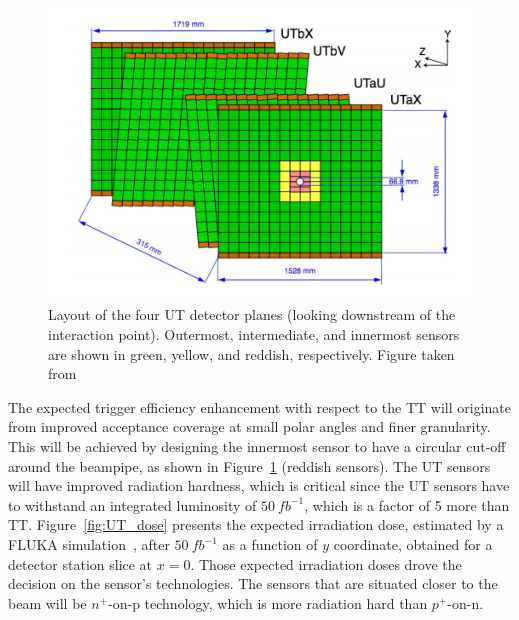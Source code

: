  \begin{figure}[!h]
\centering
\includegraphics{figures/UT.png}
\caption{Layout of the four UT detector planes (looking downstream of the interaction point). Outermost, intermediate, and innermost sensors are shown in green, yellow, and reddish, respectively. Figure taken from~\cite{upgrade_tracker_tdr}
\label{fig:UT_scheme}}
\end{figure}


The expected trigger efficiency enhancement with respect to the TT will originate from improved acceptance coverage at small polar angles and finer granularity.  This will be achieved by designing the innermost sensor to have a circular cut-off around the beampipe, as shown in Figure~\ref{fig:UT_scheme} (reddish sensors). The UT sensors will have improved radiation hardness, which is critical since the UT sensors have to withstand an integrated luminosity of $50~ fb^{-1}$, which is a factor of 5 more than TT. Figure~\ref{fig:UT_dose} presents  the expected irradiation dose, estimated by a FLUKA simulation~\cite{fluka}, after $50~ fb^{-1}$ as a function of $y$ coordinate, obtained for a detector station slice at $x=0$. Those expected irradiation doses drove the decision on the sensor's technologies. The sensors that are situated closer to the beam will be $n^{+}\text{-on-p}$ technology, which is more radiation hard than $p^{+}\text{-on-n}$.  
 
